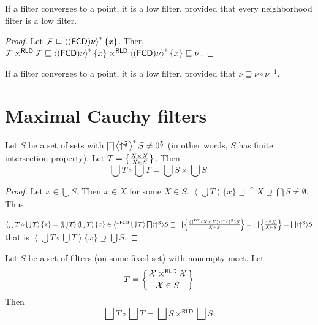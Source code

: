 \begin{prop}
  If a filter converges to a point, it is a low filter, provided that every
  neighborhood filter is a low filter.
\end{prop}

\begin{proof}
  Let $\mathcal{F} \sqsubseteq \left\langle (\mathsf{FCD}) \nu\right\rangle ^{\ast} \{ x \}$. Then $\mathcal{F} \times^{\mathsf{RLD}}
  \mathcal{F} \sqsubseteq \left\langle (\mathsf{FCD}) \nu\right\rangle ^{\ast} \{
  x \} \times^{\mathsf{RLD}} \left\langle (\mathsf{FCD}) \nu\right\rangle ^{\ast} \{ x \} \sqsubseteq \nu$.
\end{proof}

\begin{cor}
  If a filter converges to a point, it is a low filter, provided that $\nu
  \sqsupseteq \nu \circ \nu^{- 1}$.
\end{cor}

\section{Maximal Cauchy filters}

\begin{lem}
  Let $S$ be a set of sets with $\bigsqcap \left\langle  \uparrow^{\mathfrak{F}} \right\rangle ^{\ast}
  S \neq 0^{\mathfrak{F}}$ (in other words, $S$ has finite
  intersection property). Let $T = \left\{ \frac{ X \times X}{X \in S }\right\}$. Then
  \[ \bigcup T \circ \bigcup T = \bigcup S \times \bigcup S. \]
\end{lem}

\begin{proof}
  Let $x \in \bigcup S$. Then $x \in X$ for some $X \in S$. $\left\langle
  \bigcup T \right\rangle \{ x \} \sqsupseteq \uparrow X \supseteq \bigcap S
  \neq \emptyset$. Thus
  
  $\left\langle \bigcup T \circ \bigcup T \right\rangle \{ x \} = \left\langle
  \bigcup T \right\rangle \left\langle \bigcup T \right\rangle \{ x \} \in
  \left\langle \uparrow^{\mathsf{FCD}} \bigcup T \right\rangle
  \bigsqcap \langle \uparrow^{\mathfrak{F}} \rangle S \sqsupseteq \bigsqcup
  \setcond{ \langle \uparrow^{\mathsf{FCD}} (X \times X) \rangle
  \bigsqcap \langle \uparrow^{\mathfrak{F}} \rangle S }{
  X \in S } = \bigsqcup \setcond{ \uparrow^{\mathfrak{F}} X}{X \in S } =
  \bigsqcup \langle
  \uparrow^{\mathfrak{F}} \rangle S$ that is $\left\langle \bigcup T \circ
  \bigcup T \right\rangle \{ x \} \supseteq \bigcup S$.
\end{proof}

\begin{cor}
  Let $S$ be a set of filters (on some fixed set) with nonempty meet. Let
  \[ T = \left\{ \frac{ \mathcal{X} \times^{\mathsf{RLD}} \mathcal{X} }{\mathcal{X} \in S}\right\} \]
  Then
  \[ \bigsqcup T \circ \bigsqcup T = \bigsqcup S \times^{\mathsf{RLD}}
     \bigsqcup S. \]
\end{cor}

